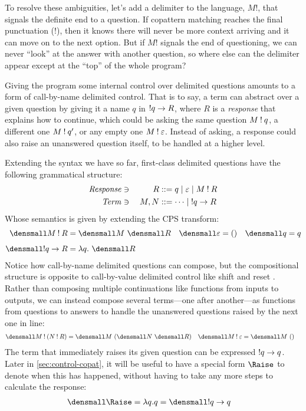 \documentclass[sigplan,screen]{acmart}
\begin{document}
To resolve these ambiguities, let's add a delimiter to the language, $M!$, that
signals the definite end to a question.  If copattern matching reaches the final
punctuation ($!$), then it knows there will never be more context arriving and
it can move on to the next option.  But if $M!$ signals the end of questioning,
we can never ``look'' at the answer with another question, so where else can the
delimiter appear except at the ``top'' of the whole program?

Giving the program some internal control over delimited questions amounts to a
form of call-by-name delimited control.  That is to say, a term can abstract
over a given question by giving it a name $q$ in $\mathbin{!} q \to R$, where $R$ is a
\emph{response} that explains how to continue, which could be asking the same
question $M \mathbin{!} q$, a different one $M \mathbin{!} q'$, or any empty one
$M \mathbin{!} \varepsilon$.  Instead of asking, a response could also raise an
unanswered question itself, to be handled at a higher level.

Extending the syntax we have so far, first-class delimited questions have the
following grammatical structure:
\begin{alignat*}{2}
  \mathit{Response} &\ni{}& R
  &::= q
  \mid \varepsilon
  \mid M \mathbin{!} R
  \\
  \mathit{Term} &\ni{}& M, N
  &::= \dots
  \mid \mathbin{!} q \to R
\end{alignat*}
Whose semantics is given by extending the CPS transform:
\begin{align*}
  \den{M \ans R}
  &=
  \den{M} ~ \den{R}
  &
  \den{\varepsilon}
  &=
  ()
  &
  \den{q}
  &=
  q
  \\[1ex]
  \den{\ans q \to R}
  &=
  \lambda q.~ \den{R}
\end{align*}
Notice how call-by-name delimited questions can compose, but the compositional
structure is opposite to call-by-value delimited control like shift and reset
\cite{AbstractingControl,FunctionalAbstractionTypedContexts}.  Rather than
composing multiple continuations like functions from inputs to outputs, we can
instead compose several terms---one after another---as functions from questions
to answers to handle the unanswered questions raised by the next one in line:
\begin{align*}
  \den{M \ans (N \ans R)}
  &=
  \den{M} ~ (\den{N} ~ \den{R})
  &
  \den{M \ans \varepsilon}
  &=
  \den{M} ~ ()
\end{align*}
The term that immediately raises its given question can be expressed
$\mathbin{!} q \to q$.  Later in \cref{sec:control-copat}, it will be useful to have a
special form $\Raise$ to denote when this has happened, without having to take
any more steps to calculate the response:
\begin{align*}
  \den{\Raise}
  &=
  \lambda q. q
  = \den{\ans q \to q}
\end{align*}
\end{document}
